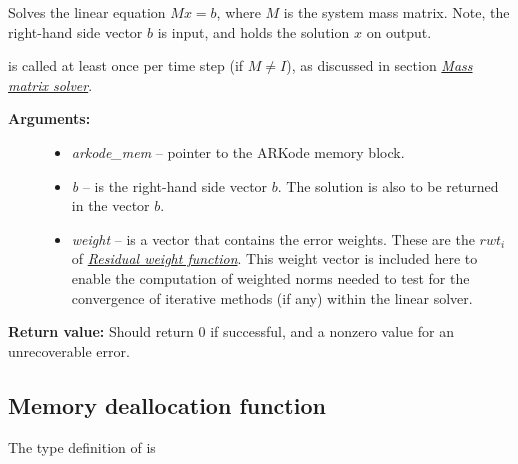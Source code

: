 \documentclass[letterpaper,10pt,english]{sphinxmanual}
\begin{document}
\begin{fulllineitems}
\label{linear_solvers/custom:msolve}
Solves the linear equation $M x = b$, where $M$ is the
system mass matrix.  Note, the right-hand side vector $b$ is
input, and holds the solution $x$ on output.

{\hyperref[linear_solvers/custom:msolve]{}} is called at least once per time step (if
$M\ne I$), as discussed in section {\hyperref[Mathematics:mathematics-masssolve]{\emph{Mass matrix solver}}}.
\begin{description}
\item[{\textbf{Arguments:}}] \leavevmode\begin{itemize}
\item {} 
\emph{arkode\_mem} -- pointer to the ARKode memory block.

\item {} 
\emph{b} -- is the right-hand side vector $b$. The solution
is also to be returned in the vector $b$.

\item {} 
\emph{weight} -- is a vector that contains the error weights. These
are the $rwt_i$ of {\hyperref[c_interface/User_supplied:cinterface-residualweight]{\emph{Residual weight function}}}.
This weight vector is included here to enable the computation
of weighted norms needed to test for the convergence of
iterative methods (if any) within the linear solver.

\end{itemize}

\end{description}

\textbf{Return value:}  Should return 0 if successful, and a nonzero
value for an unrecoverable error.

\end{fulllineitems}



\subsection{Memory deallocation function}
\label{linear_solvers/custom:memory-deallocation-function}
The type definition of {\hyperref[linear_solvers/custom:lfree]{}} is
\end{document}
